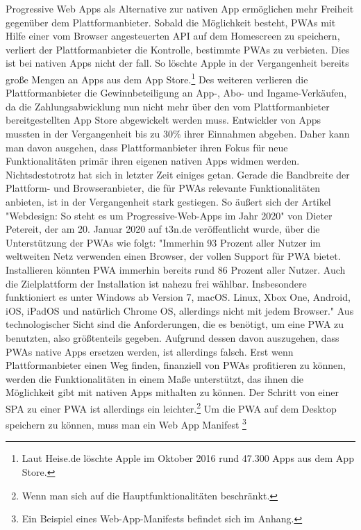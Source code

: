 Progressive Web Apps als Alternative zur nativen App ermöglichen mehr Freiheit gegenüber dem
Plattformanbieter. Sobald die Möglichkeit besteht, PWAs mit Hilfe einer vom Browser angesteuerten API
auf dem Homescreen zu speichern, verliert der Plattformanbieter die Kontrolle,
bestimmte PWAs zu verbieten. Dies ist bei nativen Apps nicht der fall. So löschte Apple in der Vergangenheit
bereits große Mengen an Apps aus dem App Store.\footnote{Laut Heise.de löschte Apple im Oktober 2016 rund 47.300 Apps aus dem App Store.\cite{HeiseAppleLoeschtApps}} 
Des weiteren verlieren die Plattformanbieter die Gewinnbeteiligung an App-, Abo- und Ingame-Verkäufen,
da die Zahlungsabwicklung nun nicht mehr über den vom Plattformanbieter bereitgestellten App Store
abgewickelt werden muss. Entwickler von Apps mussten in der Vergangenheit bis zu 30\% 
ihrer Einnahmen abgeben. \cite{WinFutureEigenerAppStore} Daher kann man davon ausgehen,
dass Plattformanbieter ihren Fokus für neue Funktionalitäten primär ihren eigenen
nativen Apps widmen werden. Nichtsdestotrotz hat sich in letzter Zeit einiges getan.
Gerade die Bandbreite der Plattform- und Browseranbieter, die für PWAs relevante
Funktionalitäten anbieten, ist in der Vergangenheit stark gestiegen. So äußert sich der Artikel
"Webdesign: So steht es um Progressive-Web-Apps im Jahr 2020" von Dieter Petereit,
der am 20. Januar 2020 auf t3n.de veröffentlicht wurde, über die Unterstützung der PWAs wie folgt:
"Immerhin 93 Prozent aller Nutzer im weltweiten Netz verwenden einen Browser, der vollen Support
für PWA bietet. Installieren könnten PWA immerhin bereits rund 86 Prozent aller Nutzer. Auch
die Zielplattform der Installation ist nahezu frei wählbar. Insbesondere funktioniert es
unter Windows ab Version 7, macOS. Linux, Xbox One, Android, iOS, iPadOS und natürlich Chrome OS,
allerdings nicht mit jedem Browser."\cite{T3NPWASupport} Aus technologischer Sicht sind die
Anforderungen, die es benötigt, um eine PWA zu benutzten, also größtenteils gegeben.
Aufgrund dessen davon auszugehen, dass PWAs native Apps ersetzen werden, ist allerdings
falsch. Erst wenn Plattformanbieter einen Weg finden, finanziell von PWAs profitieren
zu können, werden die Funktionalitäten in einem Maße unterstützt, das ihnen die Möglichkeit
gibt mit nativen Apps mithalten zu können. Der Schritt von einer SPA zu einer
PWA ist allerdings ein leichter.\footnote{Wenn man sich auf die Hauptfunktionalitäten beschränkt.}
Um die PWA auf dem Desktop speichern zu können, muss man ein Web App Manifest
\footnote{Ein Beispiel eines Web-App-Manifests befindet sich im Anhang.}
